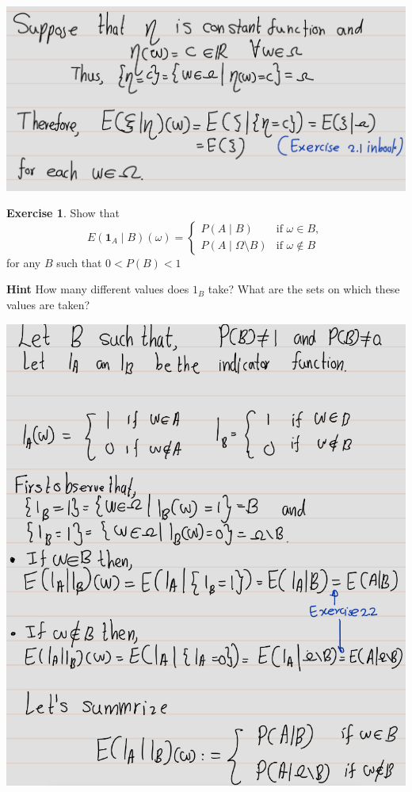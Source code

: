 \documentclass[
]{book}
\theoremstyle{definition}
\theoremstyle{definition}
\theoremstyle{definition}
\newtheorem{exercise}{Exercise}[chapter]
\theoremstyle{definition}
\theoremstyle{remark}
\begin{document}
\includegraphics[width=18cm,height=\textheight]{fig/fig ex2.3.png}

\begin{exercise}
\protect\hypertarget{exr:unnamed-chunk-50}{}\label{exr:unnamed-chunk-50}Show that
\[
E(\mathbf{1}_A \mid B)(\omega) = 
\begin{cases} 
P(A \mid B) & \text{if } \omega \in B, \\
P(A \mid \Omega\setminus B) & \text{if } \omega \notin B
\end{cases}
\]
for any \(B\) such that \(0 < P(B) < 1\)

\textbf{Hint} How many different values does \(1_B\) take? What are the sets on which these values are taken?
\end{exercise}

\includegraphics[width=18cm,height=\textheight]{fig/fig ex2.4.png}
\end{document}
